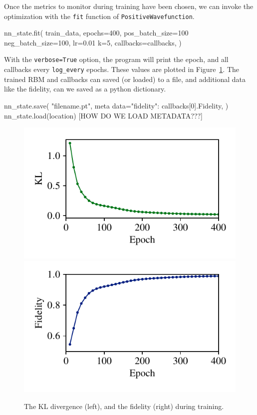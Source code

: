 \documentclass[submission, Phys]{SciPost}
\begin{document}
Once the metrics to monitor during training have been chosen, we can invoke the optimization with the \verb|fit| function of \verb|PositiveWavefunction|.


\begin{python}
nn_state.fit(
    train_data,
    epochs=400,
    pos_batch_size=100
    neg_batch_size=100,
    lr=0.01
    k=5,
    callbacks=callbacks,
)
\end{python}

With the \verb|verbose=True| option, the program will print the epoch, and all callbacks every \verb|log_every| epochs. These values are plotted in Figure~\ref{fig:KL}. 
The trained RBM and callbacks can saved (or loaded) to a file, and additional data like the fidelity, can we saved as a python dictionary.
\begin{python}
nn_state.save(
    "filename.pt",
    meta data={"fidelity": callbacks[0].Fidelity},
)
nn_state.load(location) [HOW DO WE LOAD METADATA???]
\end{python}


\begin{figure}[]
    \centering
    \includegraphics[width=0.48\linewidth, trim={10 14 10 10}, clip]{plots/KL.pdf}
    \includegraphics[width=0.48\linewidth, trim={10 14 10 10}, clip]{plots/fid.pdf}
    \caption{The KL divergence (left), and the fidelity (right) during training.
    }
    \label{fig:KL}
\end{figure}

\end{document}
